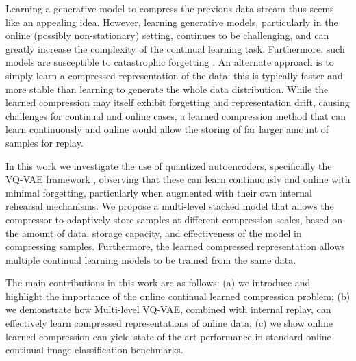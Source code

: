 \documentclass[colorinlistoftodos]{article} %
\begin{document}
Learning a generative model to compress the previous data stream thus seems like an appealing idea. However, learning generative models, particularly in the online (possibly non-stationary) setting, continues to be challenging, and can greatly increase the complexity of the continual learning task. Furthermore, such models are susceptible to catastrophic forgetting \cite{aljundi2019online}. 
An alternate approach is to simply learn a compressed representation of the data; this is typically faster and more stable than learning to generate the whole data distribution. While the learned compression may itself exhibit forgetting and representation drift, causing challenges for continual and online cases, a learned compression method that can learn continuously and online would allow the storing of far larger amount of samples for replay.


In this work we investigate the use of quantized autoencoders, specifically the VQ-VAE framework \cite{van2017neural}, observing that these can learn continuously and online with minimal forgetting, particularly when augmented with their own internal rehearsal mechanisms. We propose a multi-level stacked model that allows the compressor to adaptively store samples at different compression scales, based on the amount of data, storage capacity, and effectiveness of the model in compressing samples. Furthermore, the learned compressed representation allows multiple continual learning models to be trained from the same data.

The main contributions in this work are as follows: (a) we introduce and highlight the importance of the online continual learned compression problem; (b) we demonstrate how Multi-level VQ-VAE, combined with internal replay, can effectively learn compressed representations of online data, (c) we show online learned compression can yield state-of-the-art performance in standard online continual image classification benchmarks.

\end{document}
